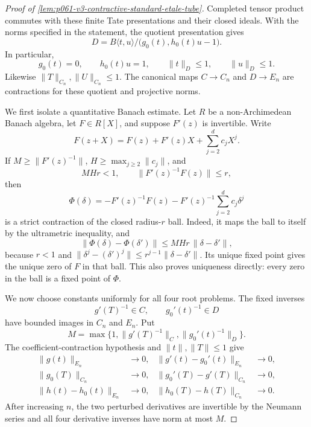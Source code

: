 \begin{proof}[Proof of
\cref{lem:p061-v3-contractive-standard-etale-tube}]
Completed tensor product commutes with these finite Tate presentations and
their closed ideals. With the norms specified in the statement, the quotient
presentation gives
\[
 D=B\langle t,u\rangle/
       \bigl(g_0(t),h_0(t)u-1\bigr).
\]
In particular,
\begin{equation}\label{eq:p061-v3-exact-central-relations}
 g_0(t)=0,
 \qquad h_0(t)u=1,
 \qquad \|t\|_D\leq1,
 \qquad \|u\|_D\leq1.
\end{equation}
Likewise \(\|T\|_{C_n},\|U\|_{C_n}\leq1\). The canonical maps
\(C\to C_n\) and \(D\to E_n\) are contractions for these quotient and
projective norms.

We first isolate a quantitative Banach estimate. Let \(R\) be a
non-Archimedean Banach algebra, let \(F\in R[X]\), and suppose
\(F'(z)\) is invertible. Write
\begin{equation}\label{eq:p061-v3-taylor-expansion}
 F(z+X)=F(z)+F'(z)X+\sum_{j=2}^{d}c_jX^j.
\end{equation}
If \(M\geq\|F'(z)^{-1}\|\), \(H\geq\max_{j\geq2}\|c_j\|\), and
\begin{equation}\label{eq:p061-v3-newton-inequalities}
                 MH r<1,
 \qquad \|F'(z)^{-1}F(z)\|\leq r,
\end{equation}
then
\[
 \Phi(\delta)=
 -F'(z)^{-1}F(z)
 -F'(z)^{-1}\sum_{j=2}^{d}c_j\delta^j
\]
is a strict contraction of the closed radius-\(r\) ball. Indeed, it maps
the ball to itself by the ultrametric inequality, and
\[
 \|\Phi(\delta)-\Phi(\delta')\|
 \leq MH r\,\|\delta-\delta'\|,
\]
because \(r<1\) and
\(\|\delta^j-(\delta')^j\|\leq
r^{j-1}\|\delta-\delta'\|\). Its unique fixed point gives the unique zero
of \(F\) in that ball. This also proves uniqueness directly: every zero in
the ball is a fixed point of \(\Phi\).

We now choose constants uniformly for all four root problems. The fixed
inverses
\[
                  g'(T)^{-1}\in C,
 \qquad g_0'(t)^{-1}\in D
\]
have bounded images in \(C_n\) and \(E_n\). Put
\[
 M=\max\bigl\{1,\|g'(T)^{-1}\|_C,
                    \|g_0'(t)^{-1}\|_D\bigr\}.
\]
The coefficient-contraction hypothesis and
\(\|t\|,\|T\|\leq1\) give
\begin{equation}\label{eq:p061-v3-polynomial-errors}
 \begin{aligned}
  \|g(t)\|_{E_n}&\longrightarrow0,&
  \|g'(t)-g_0'(t)\|_{E_n}&\longrightarrow0,\\
  \|g_0(T)\|_{C_n}&\longrightarrow0,&
  \|g_0'(T)-g'(T)\|_{C_n}&\longrightarrow0,\\
  \|h(t)-h_0(t)\|_{E_n}&\longrightarrow0,&
  \|h_0(T)-h(T)\|_{C_n}&\longrightarrow0.
 \end{aligned}
\end{equation}
After increasing \(n\), the two perturbed derivatives are invertible by
the Neumann series and all four derivative inverses have norm at most
\(M\).


\end{proof}
